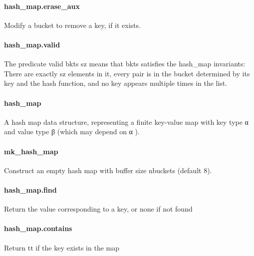 \documentclass{article}
\begin{document}
\paragraph{hash\_map.erase\_aux}
\par
Modify a bucket to remove a key, if it exists.
\paragraph{hash\_map.valid}
\par
The predicate 
\colorbox[RGB]{253,246,227}{{{{\color[RGB]{101, 123, 131} valid bkts sz }}}} means that 
\colorbox[RGB]{253,246,227}{{{{\color[RGB]{101, 123, 131} bkts }}}} satisfies the 
\colorbox[RGB]{253,246,227}{{{{\color[RGB]{101, 123, 131} hash\_map }}}}invariants: There are exactly 
\colorbox[RGB]{253,246,227}{{{{\color[RGB]{101, 123, 131} sz }}}} elements in it, every pair is in the
bucket determined by its key and the hash function, and no key appears
multiple times in the list.
\paragraph{hash\_map}
\par
A hash map data structure, representing a finite key-value map
with key type 
\colorbox[RGB]{253,246,227}{{{{\color[RGB]{101, 123, 131} α }}}} and value type 
\colorbox[RGB]{253,246,227}{{{{\color[RGB]{101, 123, 131} β }}}} (which may depend on 
\colorbox[RGB]{253,246,227}{{{{\color[RGB]{101, 123, 131} α }}}}).
\paragraph{mk\_hash\_map}
\par
Construct an empty hash map with buffer size 
\colorbox[RGB]{253,246,227}{{{{\color[RGB]{101, 123, 131} nbuckets }}}} (default 8).
\paragraph{hash\_map.find}
\par
Return the value corresponding to a key, or 
\colorbox[RGB]{253,246,227}{{{{\color[RGB]{101, 123, 131} none }}}} if not found
\paragraph{hash\_map.contains}
\par
Return 
\colorbox[RGB]{253,246,227}{{{{\color[RGB]{101, 123, 131} tt }}}} if the key exists in the map
\end{document}
